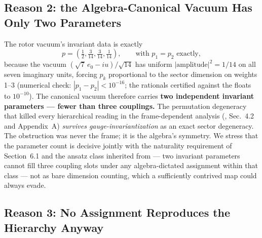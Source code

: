 \documentclass[11pt]{article}
\begin{document}
\subsection{Reason 2: the Algebra-Canonical Vacuum Has Only Two Parameters}

The rotor vacuum's invariant data is exactly
\begin{equation*}
p = \left(\tfrac{1}{2}, \tfrac{3}{14}, \tfrac{3}{14}, \tfrac{1}{14}\right), \qquad \text{with } p_1 = p_2 \text{ exactly},
\end{equation*}
because the vacuum $(\sqrt{7}\,e_0 - iu)/\sqrt{14}$ has uniform $|\text{amplitude}|^2 = 1/14$ on all seven imaginary units, forcing $p_k$ proportional to the sector dimension on weights 1--3 (numerical check: $|p_1 - p_2| < 10^{-16}$; the rationals certified against the floats to $10^{-10}$). The canonical vacuum therefore carries \textbf{two independent invariant parameters --- fewer than three couplings.} The permutation degeneracy that killed every hierarchical reading in the frame-dependent analysis (\cite{companion}, Sec.~4.2 and Appendix~A) \emph{survives gauge-invariantization} as an exact sector degeneracy. The obstruction was never the frame; it is the algebra's symmetry. We stress that the parameter count is decisive jointly with the naturality requirement of Section~6.1 and the ansatz class inherited from \cite{companion} --- two invariant parameters cannot fill three coupling slots under any algebra-dictated assignment within that class --- not as bare dimension counting, which a sufficiently contrived map could always evade.

\subsection{Reason 3: No Assignment Reproduces the Hierarchy Anyway}
\end{document}
